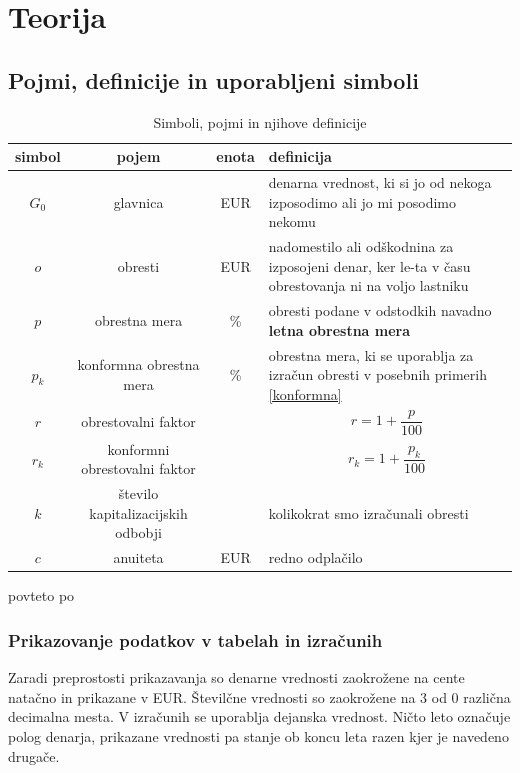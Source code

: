 \documentclass[12pt]{article}
\begin{document}
\section{Teorija}
    \subsection{Pojmi, definicije in uporabljeni simboli}
        \begin{table}[h!]
            \centering
            \begin{tabular}{|c|c|c|p{7cm}|}
                \hline
                \textbf{simbol} & \textbf{pojem} & \textbf{enota} & \textbf{definicija} \\ \hline
                $G_0$ & glavnica                & EUR    & denarna vrednost, ki si jo od nekoga izposodimo ali jo mi posodimo nekomu \\ \hline 
                $o$   & obresti                 & EUR    & nadomestilo ali odškodnina za izposojeni denar, ker le-ta v času obrestovanja ni na voljo lastniku \\ \hline
                $p$   & obrestna mera           & \%     & obresti podane v odstodkih navadno \textbf{letna obrestna mera} \\ \hline
                $p_k$ & konformna obrestna mera & \%     & obrestna mera, ki se uporablja za izračun obresti v posebnih primerih \ref{konformna} \\ \hline
                $r$   & obrestovalni faktor     &        & $$r = 1 + \frac{p}{100}$$ \\ \hline
                $r_k$ & konformni obrestovalni faktor &  & $$r_k = 1 + \frac{p_k}{100}$$ \\ \hline
                $k$   & število kapitalizacijskih odbobji &  & kolikokrat smo izračunali obresti \\ \hline
                $c$   & anuiteta                & EUR    & redno odplačilo \\ \hline
            \end{tabular}

            \medskip
            \centering povteto po \cite{vega4}
            \caption{Simboli, pojmi in njihove definicije}
            \label{tab:simboli}
        \end{table}

        \subsubsection{Prikazovanje podatkov v tabelah in izračunih}
        Zaradi preprostosti prikazavanja so denarne vrednosti zaokrožene na cente natačno
        in prikazane v EUR. Številčne vrednosti so zaokrožene na 3 od 0 različna decimalna 
        mesta. V izračunih se uporablja dejanska vrednost. Ničto leto označuje polog denarja,
        prikazane vrednosti pa stanje ob koncu leta razen kjer je navedeno drugače. 
\end{document}
